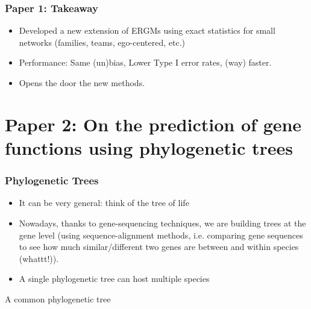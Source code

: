 \documentclass[aspectratio=169, 10pt]{beamer}
\def\cursection{\frame{\frametitle{Contents}\tableofcontents[current]}}
\begin{document}
\begin{frame}
\frametitle{Paper 1: Takeaway}
\pause
\begin{itemize}
\item Developed a new extension of ERGMs using exact statistics for small networks
(families, teams, ego-centered, etc.)\pause
\item Performance: Same (un)bias, Lower Type I error rates, (way) faster.\pause
\item Opens the door the new methods.
\end{itemize}
\end{frame}


\section{Paper 2: On the prediction of gene functions using phylogenetic trees}
\cursection

\begin{frame}
\frametitle{Phylogenetic Trees}

\begin{itemize}
\item It can be very general: think of the tree of life
\item Nowadays, thanks to gene-sequencing techniques, we are building trees at the
gene level (using sequence-alignment methods, i.e. comparing gene sequences to see how much similar/different two genes are between and within species (whattt!)).
\item A single phylogenetic tree can host multiple species
\end{itemize}

\end{frame}

\begin{frame}
A common phylogenetic tree
\end{frame}
\end{document}
